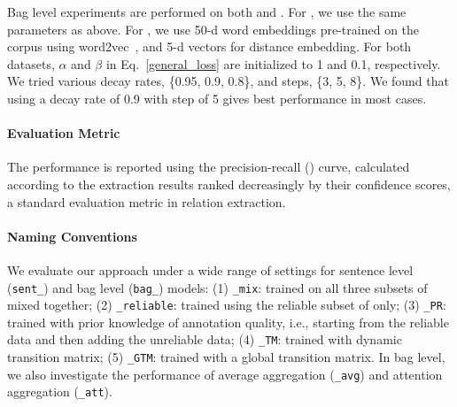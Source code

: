 Bag level experiments are performed on both  \TimeRE and  \EntityRE. For \TimeRE, we use the same parameters as above.
For \EntityRE, we use 50-d word embeddings pre-trained on the \NYT corpus using word2vec~\cite{mikolov2013distributed}, 
and 5-d vectors for distance embedding.
For both datasets,  $\alpha$ and $\beta$ in Eq.~\ref{general_loss} are initialized to 1 and 0.1, respectively. We tried various decay rates, \{0.95, 0.9, 0.8\}, and steps, \{3, 5, 8\}. We found that using a decay rate of 0.9 with step of 5 gives best performance in most cases.

\paragraph{Evaluation Metric}
The performance is reported using the precision-recall (\PR) curve, calculated according to the extraction results ranked decreasingly by their confidence scores, a standard evaluation metric in relation extraction.

\paragraph{Naming Conventions}
We evaluate our approach under a wide range of settings for
 sentence level
(\texttt{sent\_}) and bag level (\texttt{bag\_}) models:
(1) \texttt{\_mix}:  trained on all three subsets of \TimeRE mixed together;
(2) \texttt{\_reliable}:  trained using the reliable subset of \TimeRE only;
(3) \texttt{\_PR}:  trained with prior knowledge of annotation quality, i.e., starting from the reliable data and then adding the unreliable data;
(4) \texttt{\_TM}: trained with dynamic transition matrix;
(5) \texttt{\_GTM}:  trained with a global transition matrix.
%
%
In bag level, we also investigate the performance   %
of average aggregation (\texttt{\_avg})
and attention aggregation (\texttt{\_att}).



